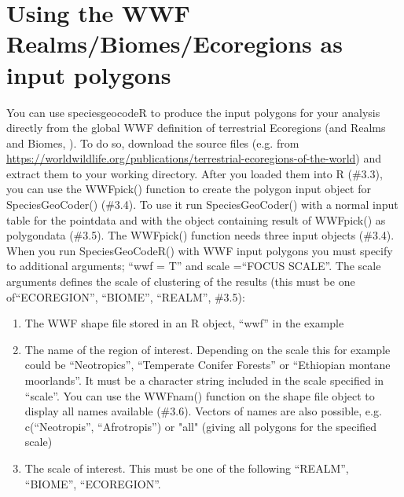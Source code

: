 \documentclass[a4paper,titlepage,11pt]{scrreprt}
\begin{document}
\chapter{Using the WWF Realms/Biomes/Ecoregions as input polygons}
You can use speciesgeocodeR to produce the input polygons for your analysis directly from the global WWF definition of terrestrial Ecoregions (and Realms and Biomes, \citet{WWF}). To do so, download the source files (e.g. from \url{https://worldwildlife.org/publications/terrestrial-ecoregions-of-the-world}) and extract them to your working directory. After you loaded them into R (\#3.3), you can use the WWFpick() function to create the polygon input object for SpeciesGeoCoder() (\#3.4). To use it run SpeciesGeoCoder()  with a normal input table for the pointdata and with the object containing result of WWFpick() as polygondata (\#3.5). The WWFpick() function needs three input objects (\#3.4). When you run SpeciesGeoCodeR() with WWF input polygons you must specify to additional arguments; ``wwf = T'' and scale =``FOCUS SCALE''. The scale arguments defines the scale of clustering of the results (this must be one of``ECOREGION'', ``BIOME'', ``REALM'', \#3.5):

\begin{enumerate}
\item{The WWF shape file stored in an R object, ``wwf'' in the example}
\item{The name of the region of interest. Depending on the scale this for example could be ``Neotropics'', ``Temperate Conifer Forests'' or ``Ethiopian montane moorlands''. It must be a character string included in the scale specified in ``scale''. You can use the WWFnam() function on the shape file object to display all names available (\#3.6). Vectors of names are also possible, e.g. c(``Neotropis'', ``Afrotropis'') or "all" (giving all polygons for the specified scale)}
\item{The scale of interest. This must be one of the following ``REALM'', ``BIOME'', ``ECOREGION''.}
\end{enumerate}
\newpage
\end{document}
